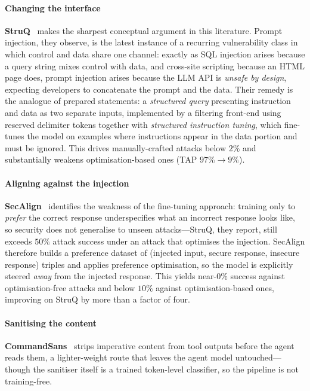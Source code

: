 \documentclass[pdflatex,sn-basic]{sn-jnl}%
\theoremstyle{thmstyleone}
\theoremstyle{thmstyletwo}
\theoremstyle{thmstylethree}
\begin{document}
\paragraph{Changing the interface}
\textbf{StruQ}~\citep{chen2025struq} makes the sharpest conceptual argument in
this literature. Prompt injection, they observe, is the latest instance of a
recurring vulnerability class in which control and data share one channel:
exactly as SQL injection arises because a query string mixes control with data,
and cross-site scripting because an HTML page does, prompt injection arises
because the LLM API is \emph{unsafe by design}, expecting developers to
concatenate the prompt and the data. Their remedy is the analogue of prepared
statements: a \emph{structured query} presenting instruction and data as two
separate inputs, implemented by a filtering front-end using reserved delimiter
tokens together with \emph{structured instruction tuning}, which fine-tunes the
model on examples where instructions appear in the data portion and must be
ignored. This drives manually-crafted attacks below $2\%$ and substantially
weakens optimisation-based ones (TAP $97\% \to 9\%$).

\paragraph{Aligning against the injection}
\textbf{SecAlign}~\citep{chen2025secalign} identifies the weakness of the
fine-tuning approach: training only to \emph{prefer} the correct response
underspecifies what an incorrect response looks like, so security does not
generalise to unseen attacks---StruQ, they report, still exceeds $50\%$ attack
success under an attack that optimises the injection. SecAlign therefore builds a
preference dataset of (injected input, secure response, insecure response) triples
and applies preference optimisation, so the model is explicitly steered
\emph{away} from the injected response. This yields near-$0\%$ success against
optimisation-free attacks and below $10\%$ against optimisation-based ones,
improving on StruQ by more than a factor of four.

\paragraph{Sanitising the content}
\textbf{CommandSans}~\citep{das2025commandsans} strips imperative content from
tool outputs before the agent reads them, a lighter-weight route that leaves the
agent model untouched---though the sanitiser itself is a trained token-level
classifier, so the pipeline is not training-free.
\end{document}
